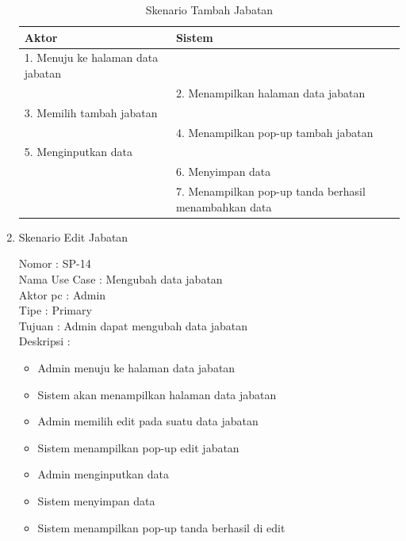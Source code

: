 \begin{enumerate}
\begin{table}
	\caption{Skenario Tambah Jabatan}
	\centering
	\begin{tabular}{ | l | p{65mm} |}
		\hline 
		\textbf{Aktor} & \textbf{Sistem} \\
		\hline
		
		1.	Menuju ke halaman data jabatan &  \\
		
		\hline
		
		&  2.	Menampilkan halaman data jabatan \\
		
		\hline
		
		3. Memilih tambah jabatan & \\
		
		\hline
		
		& 4.	Menampilkan pop-up tambah jabatan \\
		
		\hline
		
		5.	Menginputkan data  & \\
		\hline
		
		& 6.	Menyimpan data \\
		\hline
		
		& 7.	Menampilkan pop-up tanda berhasil menambahkan data \\
		\hline
		
	\end{tabular}
\end{table}

\item Skenario Edit Jabatan

Nomor \kern 3.6pc : SP-14 \\
Nama Use Case : Mengubah data jabatan \\
Aktor  pc : Admin \\
Tipe \kern 4.6pc : Primary \\
Tujuan \kern 3.6pc : Admin dapat mengubah data jabatan \\
Deskripsi \kern 2.5pc : 

\begin{itemize}
	\item Admin menuju ke halaman data jabatan
	\item Sistem akan menampilkan halaman data jabatan
	\item Admin memilih edit pada suatu data jabatan
	\item Sistem menampilkan pop-up edit jabatan
	\item Admin menginputkan data
	\item Sistem menyimpan data
	\item Sistem menampilkan pop-up tanda berhasil di edit
	

\end{itemize}
\end{enumerate}
